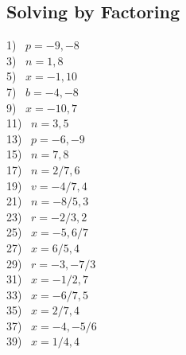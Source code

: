 \documentclass[12pt]{book}
\theoremstyle{definition}
\begin{document}
\subsection*{Solving by Factoring}




\begin{multicols}{4}
  1)~ $p=-9,-8$\\
  3)~ $n=1,8$\\
  5)~ $x=-1,10$\\
  7)~ $b=-4,-8$\\
  9)~ $x=-10,7$\\
  11)~ $n=3,5$\\
  13)~ $p=-6,-9$\\
  15)~ $n=7,8$\\
17)~ $n=2/7,6$\\
19)~ $v=-4/7,4$\\
21)~ $n=-8/5,3$\\
23)~ $r=-2/3,2$\\
25)~ $x=-5,6/7$\\
27)~ $x=6/5,4$\\
29)~ $r=-3,-7/3$\\
  31)~ $x=-1/2,7$\\
  33)~ $x=-6/7,5$\\
  35)~ $x=2/7,4$\\
  37)~ $x=-4,-5/6$\\
  39)~ $x=1/4,4$%
\end{multicols}
\end{document}
